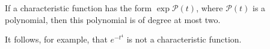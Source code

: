 If a characteristic function has the form $\exp \mathcal{P}(t)$, where $\mathcal{P}(t)$ is a polynomial, then this polynomial is of degree at most two.

It follows, for example, that $e^{-t^4}$ is not a characteristic function.
